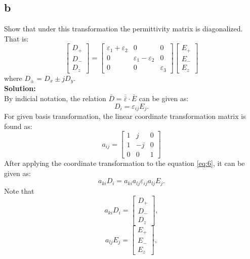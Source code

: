 \documentclass[11pt]{amsart}
\begin{document}
\subsection*{b}
Show that under this transformation the permittivity matrix is diagonalized. That is:
\begin{equation*}
\begin{bmatrix}
 D_+\\ 
D_-\\ 
D_z
\end{bmatrix}
=
\begin{bmatrix}
 \varepsilon_1 + \varepsilon_2 & 0 & 0 \\ 
0 &  \varepsilon_1 -\varepsilon_2 & 0 \\ 
0 & 0 & \varepsilon_3
\end{bmatrix}
\begin{bmatrix}
E_+ \\ 
E_- \\ 
E_z 
\end{bmatrix}
\end{equation*}
where $D_{\pm}=D_x \pm j D_y$.
\\
\textbf{Solution:}\\
By indicial notation, the relation $\bar{D}=\overline{\overline{\varepsilon}}\cdot \bar{E}$ can be given as:
\begin{equation}
\label{eq:6}
D_i = \varepsilon_{ij}E_j.
\end{equation}
For given basis transformation, the linear coordinate transformation matrix is found as:
\begin{equation}
\label{eq:7}
a_{ij}=
\begin{bmatrix}
1 & j & 0 \\ 
1 &  -j & 0 \\ 
0 & 0 & 1
\end{bmatrix}
\end{equation}
After applying the coordinate transformation to the equation \ref{eq:6}, it can be given as:
\begin{equation}
\label{eq:8}
a_{ki}D_i=a_{ki}a_{lj}\varepsilon_{ij} a_{lj}E_j.
\end{equation}
Note that 
\begin{equation}
\label{eq:9}
a_{ki}D_i=
\begin{bmatrix}
 D_+\\ 
D_-\\ 
D_z
\end{bmatrix},
\end{equation}
\begin{equation}
\label{eq:10}
a_{lj}E_j=
\begin{bmatrix}
 E_+\\ 
E_-\\ 
E_z
\end{bmatrix},
\end{equation}
\end{document}
